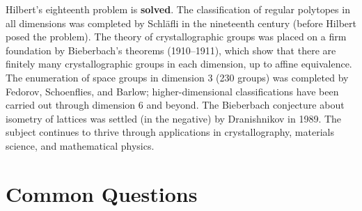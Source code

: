 \begin{solvedbox}
Hilbert's eighteenth problem is \textbf{solved}. The classification of regular polytopes in all dimensions was completed by Schläfli in the nineteenth century (before Hilbert posed the problem). The theory of crystallographic groups was placed on a firm foundation by Bieberbach's theorems (1910--1911), which show that there are finitely many crystallographic groups in each dimension, up to affine equivalence. The enumeration of space groups in dimension 3 (230 groups) was completed by Fedorov, Schoenflies, and Barlow; higher-dimensional classifications have been carried out through dimension 6 and beyond. The Bieberbach conjecture about isometry of lattices was settled (in the negative) by Dranishnikov in 1989. The subject continues to thrive through applications in crystallography, materials science, and mathematical physics.
\end{solvedbox}

\section*{Common Questions}


